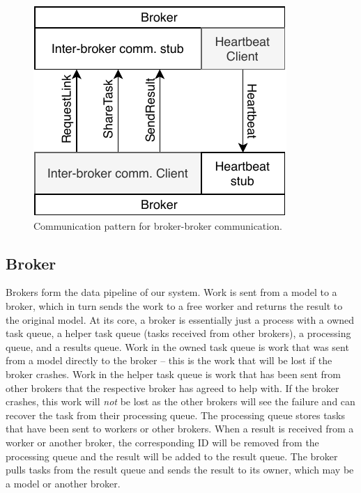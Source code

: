\documentclass[conference]{IEEEtran}
\begin{document}
% 
\begin{figure}
  \centering
  \includegraphics{img/broker_broker}
  \caption{Communication pattern for broker-broker communication.}
  \label{fig:broker-broker}
\end{figure}

\subsection{Broker}
Brokers form the data pipeline of our system. Work is sent from a model to a
broker, which in turn sends the work to a free worker and returns the result to
the original model. At its core, a broker is essentially just a process with a
owned task queue, a helper task queue (tasks received from other brokers), a
processing queue, and a results queue. Work in the owned task queue is work that
was sent from a model directly to the broker -- this is the work that will be
lost if the broker crashes. Work in the helper task queue is work that has been
sent from other brokers that the respective broker has agreed to help with. If
the broker crashes, this work will \emph{not} be lost as the other brokers will
see the failure and can recover the task from their processing queue. The
processing queue stores tasks that have been sent to workers or other
brokers. When a result is received from a worker or another broker, the
corresponding ID will be removed from the processing queue and the result will
be added to the result queue. The broker pulls tasks from the result queue and
sends the result to its owner, which may be a model or another broker.
\end{document}
